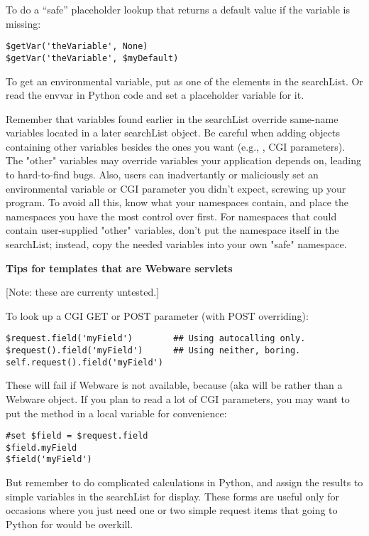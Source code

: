 To do a ``safe'' placeholder lookup that returns a default value if the
variable is missing:
\begin{verbatim}
$getVar('theVariable', None)
$getVar('theVariable', $myDefault)
\end{verbatim}

To get an environmental variable, put  as one of the
elements in the searchList.  Or read the envvar in Python code and set a
placeholder variable for it.

Remember that variables found earlier in the searchList override same-name variables
located in a later searchList object.  Be careful when adding objects containing other
variables besides the ones you want (e.g., , CGI parameters).
The "other" variables may override variables your application depends on, leading to
hard-to-find bugs.  Also, users can inadvertantly or maliciously set an environmental
variable or CGI parameter you didn't expect, screwing up your program.  To
avoid all this, know what your namespaces contain, and place the namespaces you
have the most control over first.  For namespaces that could contain
user-supplied "other" variables, don't put the namespace itself in the
searchList; instead, copy the needed variables into your own "safe" namespace.

{\bf Tips for templates that are Webware servlets}

[Note: these are currenty untested.]

To look up a CGI GET or POST parameter (with POST overriding):
\begin{verbatim}
$request.field('myField')        ## Using autocalling only.
$request().field('myField')      ## Using neither, boring.
self.request().field('myField')
\end{verbatim}
These will fail if Webware is not available, because 
(aka  will be  rather than a Webware
 object.  If you plan to read a lot of CGI parameters,
you may want to put the  method in a local variable for
convenience:
\begin{verbatim}
#set $field = $request.field
$field.myField
$field('myField')
\end{verbatim}
But remember to do complicated calculations in Python, and assign the results
to simple variables in the searchList for display.  These 
forms are useful only for occasions where you just need one or two simple
request items that going to Python for would be overkill.

